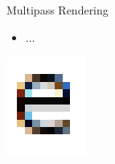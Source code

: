 \documentclass{lug}
\newcommand{\splitslide}[4]{
    \noindent
    \begin{minipage}{#1 \textwidth - #2 }
        #3
    \end{minipage}%
    \hspace{ \dimexpr #2 * 2 \relax }%
    \begin{minipage}{\textwidth - #1 \textwidth - #2 }
        #4
    \end{minipage}
}
\begin{document}
\begin{frame}{Multipass Rendering}
    \splitslide{0.65}{.7em}{
        \small
        \begin{itemize}
            \item ...
        \end{itemize}
    }{
        \includegraphics[width=\textwidth]{graphics/subpixel_e}
    }
\end{frame}
\end{document}
